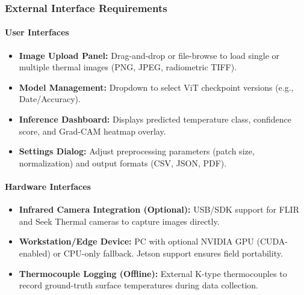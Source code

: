 \subsubsection{External Interface Requirements}

\paragraph{User Interfaces}
\begin{itemize}[leftmargin=*]
    \item \textbf{Image Upload Panel:} Drag-and-drop or file-browse to load single or multiple thermal images (PNG, JPEG, radiometric TIFF).
    \item \textbf{Model Management:} Dropdown to select ViT checkpoint versions (e.g., Date/Accuracy).
    \item \textbf{Inference Dashboard:} Displays predicted temperature class, confidence score, and Grad-CAM heatmap overlay.
    \item \textbf{Settings Dialog:} Adjust preprocessing parameters (patch size, normalization) and output formats (CSV, JSON, PDF).
\end{itemize}

\paragraph{Hardware Interfaces}
\begin{itemize}[leftmargin=*]
    \item \textbf{Infrared Camera Integration (Optional):} USB/SDK support for FLIR and Seek Thermal cameras to capture images directly.
    \item \textbf{Workstation/Edge Device:} PC with optional NVIDIA GPU (CUDA-enabled) or CPU-only fallback. Jetson support ensures field portability.
    \item \textbf{Thermocouple Logging (Offline):} External K-type thermocouples to record ground-truth surface temperatures during data collection.
\end{itemize}

